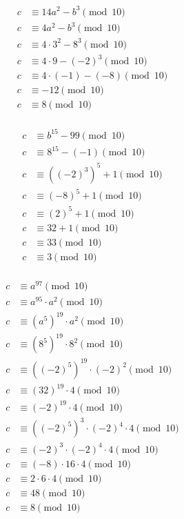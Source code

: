 \documentclass[12pt]{exam}
\begin{document}
\begin{solution}
    \begin{qparts}
        \item
        \begin{align*}
            c &\equiv 14a^2 - b^3 \pmod{10} \\
            c &\equiv 4a^2 - b^3 \pmod{10} \\
            c &\equiv 4\cdot 3^2 - 8^3 \pmod{10} \\
            c &\equiv 4\cdot 9 - (-2)^3 \pmod{10} \\
            c &\equiv 4\cdot (-1) - (-8) \pmod{10} \\
            c &\equiv -12 \pmod{10} \\
            c &\equiv 8 \pmod{10} \\
        \end{align*}
        \item \begin{align*}
            c &\equiv b^{15} - 99 \pmod{10} \\
            c &\equiv 8^{15} - (-1) \pmod{10} \\
            c &\equiv \left((-2)^{3}\right)^5 + 1 \pmod{10} \\
            c &\equiv (-8)^5 + 1 \pmod{10} \\
            c &\equiv (2)^5 + 1 \pmod{10} \\
            c &\equiv 32 + 1 \pmod{10} \\
            c &\equiv 33 \pmod{10} \\
            c &\equiv 3 \pmod{10} \\
        \end{align*}
        \item \begin{align*}
            c &\equiv a^{97} \pmod{10} \\
            c &\equiv a^{95} \cdot a^2 \pmod{10} \\
            c &\equiv \left(a^5\right)^{19} \cdot a^2 \pmod{10} \\
            c &\equiv \left(8^5\right)^{19} \cdot 8^2 \pmod{10} \\
            c &\equiv \left((-2)^5\right)^{19} \cdot (-2)^2 \pmod{10} \\
            c &\equiv \left(32\right)^{19} \cdot 4 \pmod{10} \\
            c &\equiv \left(-2\right)^{19} \cdot 4 \pmod{10} \\
            c &\equiv \left((-2)^{5}\right)^3 \cdot (-2)^4 \cdot 4 \pmod{10} \\
            c &\equiv (-2)^3 \cdot (-2)^4 \cdot 4 \pmod{10} \\
            c &\equiv (-8) \cdot 16 \cdot 4 \pmod{10} \\
            c &\equiv 2 \cdot 6 \cdot 4 \pmod{10} \\
            c &\equiv 48 \pmod{10} \\
            c &\equiv 8 \pmod{10} \\
        \end{align*}
    \end{qparts}
\end{solution}
\end{document}
